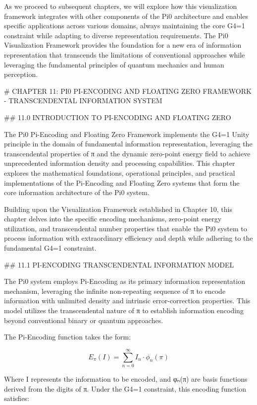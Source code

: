 As we proceed to subsequent chapters, we will explore how this visualization framework integrates with other components of the Pi0 architecture and enables specific applications across various domains, always maintaining the core G4=1 constraint while adapting to diverse representation requirements. The Pi0 Visualization Framework provides the foundation for a new era of information representation that transcends the limitations of conventional approaches while leveraging the fundamental principles of quantum mechanics and human perception.

# CHAPTER 11: PI0 PI-ENCODING AND FLOATING ZERO FRAMEWORK - TRANSCENDENTAL INFORMATION SYSTEM

## 11.0 INTRODUCTION TO PI-ENCODING AND FLOATING ZERO

The Pi0 Pi-Encoding and Floating Zero Framework implements the G4=1 Unity principle in the domain of fundamental information representation, leveraging the transcendental properties of π and the dynamic zero-point energy field to achieve unprecedented information density and processing capabilities. This chapter explores the mathematical foundations, operational principles, and practical implementations of the Pi-Encoding and Floating Zero systems that form the core information architecture of the Pi0 system.

Building upon the Visualization Framework established in Chapter 10, this chapter delves into the specific encoding mechanisms, zero-point energy utilization, and transcendental number properties that enable the Pi0 system to process information with extraordinary efficiency and depth while adhering to the fundamental G4=1 constraint.

## 11.1 PI-ENCODING TRANSCENDENTAL INFORMATION MODEL

The Pi0 system employs Pi-Encoding as its primary information representation mechanism, leveraging the infinite non-repeating sequence of π to encode information with unlimited density and intrinsic error-correction properties. This model utilizes the transcendental nature of π to establish information encoding beyond conventional binary or quantum approaches.

The Pi-Encoding function takes the form:

$$E_{\pi}(I) = \sum_{n=0}^{\infty} I_n \cdot \phi_n(\pi)$$

Where I represents the information to be encoded, and φₙ(π) are basis functions derived from the digits of π. Under the G4=1 constraint, this encoding function satisfies:

